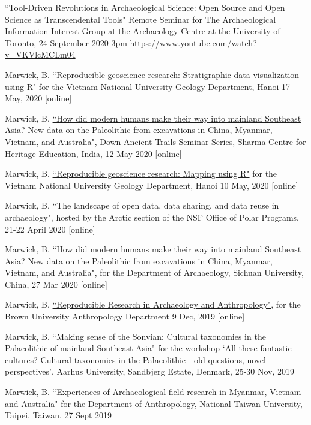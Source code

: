 \ind ``Tool-Driven Revolutions in Archaeological Science: Open Source and Open Science as Transcendental Tools" Remote Seminar for The Archaeological Information Interest Group at the Archaeology Centre at the University of Toronto, 24 September 2020 3pm  \url{https://www.youtube.com/watch?v=VKVlcMCLm04} 

\ind Marwick, B. \href{https://github.com/benmarwick/VNU-Geoscience-mapping-with-R-Workshop}{``Reproducible geoscience research: Stratigraphic data visualization using R"} for the Vietnam National University Geology Department, Hanoi 17 May, 2020 [online]

\ind Marwick, B. \href{http://www.sharmaheritage.com/down-ancient-trails-archaeology-forum-}{``How did modern humans make their way into mainland Southeast Asia? New data on the Paleolithic from excavations in China, Myanmar, Vietnam, and Australia"}, Down Ancient Trails Seminar Series, Sharma Centre for Heritage Education, India, 12 May 2020  [online]

\ind Marwick, B. \href{https://github.com/benmarwick/VNU-Geoscience-mapping-with-R-Workshop}{``Reproducible geoscience research: Mapping using R"} for the Vietnam National University Geology Department, Hanoi 10 May, 2020  [online]

\ind Marwick, B. ``The landscape of open data, data sharing, and data reuse in archaeology", hosted by the Arctic section of the NSF Office of Polar Programs, 21-22 April 2020 [online]

\ind Marwick, B. ``How did modern humans make their way into mainland Southeast Asia? New data on the Paleolithic from excavations in China, Myanmar, Vietnam, and Australia", for the Department of Archaeology, Sichuan University, China, 27 Mar 2020 [online]

\ind Marwick, B. \href{https://benmarwick.github.io/2019-12-09-brown/}{``Reproducible Research in Archaeology and Anthropology"}, for the Brown University Anthropology Department 9 Dec, 2019 [online]

\ind Marwick, B. ``Making sense of the Sonvian: Cultural taxonomies in the Palaeolithic of mainland Southeast Asia" for the workshop ‘All these fantastic cultures? Cultural taxonomies in the Palaeolithic - old questions, novel perspectives’, Aarhus University, Sandbjerg Estate, Denmark, 25-30 Nov, 2019 

\ind Marwick, B. ``Experiences of Archaeological field research in Myanmar, Vietnam and Australia" for the Department of Anthropology, National Taiwan University, Taipei, Taiwan, 27 Sept 2019

